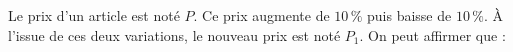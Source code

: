 
Le prix d'un article est noté $P$. Ce prix augmente de $10\,\%$ puis baisse de $10\,\%$. À l'issue de ces deux variations, le nouveau prix est noté $P_{1}$. On peut affirmer que :

\smallskip

